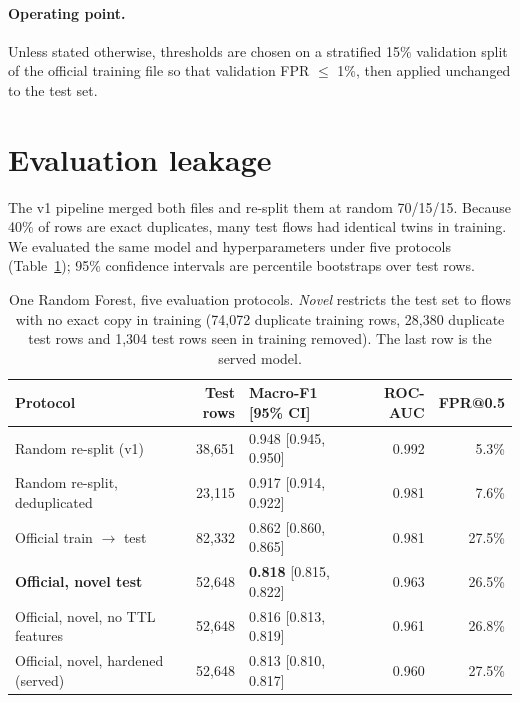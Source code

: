 \documentclass[11pt,a4paper]{article}
\begin{document}
\paragraph{Operating point.} Unless stated otherwise, thresholds are chosen
on a stratified 15\% validation split of the official training file so that
validation FPR $\le$ 1\%, then applied unchanged to the test set.

\section{Evaluation leakage}
\label{sec:leakage}

The v1 pipeline merged both files and re-split them at random 70/15/15.
Because 40\% of rows are exact duplicates, many test flows had identical
twins in training. We evaluated the same model and hyperparameters under
five protocols (Table~\ref{tab:protocols}); 95\% confidence intervals are
percentile bootstraps over test rows.

\begin{table}[h]
\centering
\small
\caption{One Random Forest, five evaluation protocols. \emph{Novel} restricts
the test set to flows with no exact copy in training (74,072 duplicate training
rows, 28,380 duplicate test rows and 1,304 test rows seen in training removed).
The last row is the served model.}
\label{tab:protocols}
\begin{tabular}{@{}lrlrr@{}}
\toprule
Protocol & Test rows & Macro-F1 [95\% CI] & ROC-AUC & FPR@0.5 \\
\midrule
Random re-split (v1)              & 38,651 & 0.948 [0.945, 0.950] & 0.992 & 5.3\% \\
Random re-split, deduplicated     & 23,115 & 0.917 [0.914, 0.922] & 0.981 & 7.6\% \\
Official train $\to$ test         & 82,332 & 0.862 [0.860, 0.865] & 0.981 & 27.5\% \\
\textbf{Official, novel test}     & 52,648 & \textbf{0.818} [0.815, 0.822] & 0.963 & 26.5\% \\
Official, novel, no TTL features  & 52,648 & 0.816 [0.813, 0.819] & 0.961 & 26.8\% \\
Official, novel, hardened (served)& 52,648 & 0.813 [0.810, 0.817] & 0.960 & 27.5\% \\
\bottomrule
\end{tabular}
\end{table}
\end{document}
